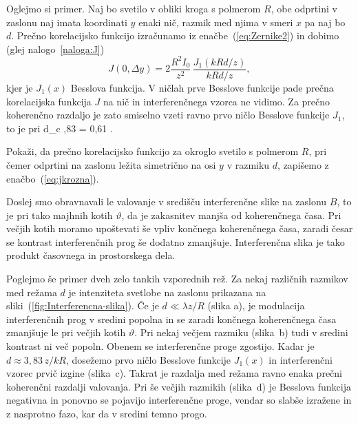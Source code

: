 Oglejmo si primer. Naj bo svetilo v obliki kroga 
s polmerom $R$, obe odprtini v zaslonu naj imata koordinati $y$  enaki nič, razmik
med njima v smeri $x$ pa naj bo $d$. 
Prečno korelacijsko funkcijo izračunamo iz enačbe~(\ref{eq:Zernike2}) in dobimo 
(glej nalogo~\ref{naloga:J})
\begin{equation}
J(0,\Delta y)=2\frac{R^{2}I_{0}}{z^{2}}\,\frac{J_{1}(kRd/z)}{kRd/z},
\label{eq:jkrozna}
\end{equation}
kjer je $J_{1}(x)$ Besslova funkcija. V ničlah prve Besslove funkcije
pade prečna korelacijska funkcija $J$ na nič in interferenčnega vzorca ne vidimo. 
Za prečno koherenčno razdaljo je zato smiselno vzeti ravno prvo ničlo Besslove funkcije
$J_1$, to je pri
\beq
\label{eq:okroglo_svetilo}
d_{c} ,83  = 0,61 .
\eeq
\begin{definition}
\label{naloga:J}
Pokaži, da prečno korelacijsko funkcijo za okroglo svetilo s polmerom $R$, pri čemer
odprtini na zaslonu ležita simetrično na osi $y$ v razmiku $d$, zapišemo z enačbo~(\ref{eq:jkrozna}). 
\end{definition}

Doslej smo obravnavali le valovanje v središču interferenčne slike na
zaslonu $B$, to je pri tako majhnih kotih $\vartheta$, da je zakasnitev
manjša od koherenčnega časa. Pri večjih kotih moramo upoštevati še
vpliv končnega koherenčnega časa, zaradi česar se kontrast interferenčnih
prog še dodatno zmanjšuje. Interferenčna slika je 
tako produkt časovnega in prostorskega dela. 

Poglejmo še primer dveh zelo tankih vzporednih rež. 
Za nekaj različnih razmikov med režama $d$ je intenziteta
svetlobe na zaslonu prikazana na sliki~(\ref{fig:Interferencna-slika}).
Če je $d\ll\lambda z/R$ (slika a), je modulacija interferenčnih prog v sredini
popolna in se zaradi končnega koherenčnega časa zmanjšuje le pri večjih
kotih $\vartheta$. Pri nekaj večjem razmiku (slika~b) tudi v sredini kontrast
ni več popoln. Obenem se interferenčne proge zgostijo. Kadar je $d\approx 3,83\,z/kR$,
dosežemo prvo ničlo Besslove funkcije $J_{1}(x)$ in interferenčni vzorec
prvič izgine (slika~c). Takrat je razdalja med režama ravno enaka prečni
koherenčni razdalji valovanja. Pri še večjih razmikih (slika~d) 
je Besslova funkcija negativna in ponovno se pojavijo interferenčne proge, 
vendar so slabše izražene in z nasprotno fazo, kar da v sredini temno progo. 

